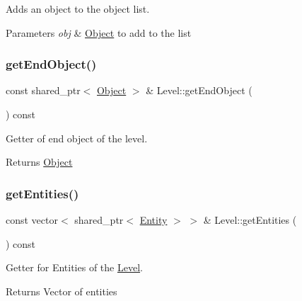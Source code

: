Adds an object to the object list. 


\begin{DoxyParams}{Parameters}
{\em obj} & \hyperlink{classObject}{Object} to add to the list \\
\hline
\end{DoxyParams}
\mbox{\label{classLevel_abbd8e0af36ea7ddd23a5f340add7771f}} 
\subsubsection{\texorpdfstring{get\+End\+Object()}{getEndObject()}}
{\footnotesize\ttfamily const shared\+\_\+ptr$<$ \hyperlink{classObject}{Object} $>$ \& Level\+::get\+End\+Object (\begin{DoxyParamCaption}{ }\end{DoxyParamCaption}) const}



Getter of end object of the level. 

\begin{DoxyReturn}{Returns}
\hyperlink{classObject}{Object} 
\end{DoxyReturn}
\mbox{\label{classLevel_a2497cf10395346c9b0cf2ed193ec46d4}} 
\subsubsection{\texorpdfstring{get\+Entities()}{getEntities()}}
{\footnotesize\ttfamily const vector$<$ shared\+\_\+ptr$<$ \hyperlink{classEntity}{Entity} $>$ $>$ \& Level\+::get\+Entities (\begin{DoxyParamCaption}{ }\end{DoxyParamCaption}) const}



Getter for Entities of the \hyperlink{classLevel}{Level}. 

\begin{DoxyReturn}{Returns}
Vector of entities 
\end{DoxyReturn}
\mbox{\label{classLevel_aeb10cc133bd8e5bb64dfa98184a8dc6f}} 
